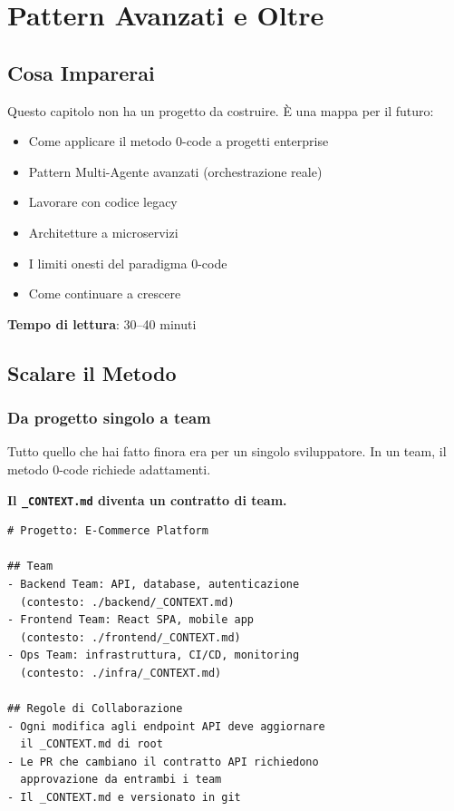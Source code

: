 \chapter{Pattern Avanzati e Oltre}

\section*{Cosa Imparerai}
Questo capitolo non ha un progetto da costruire. È una mappa per il futuro:
\begin{itemize}
  \item Come applicare il metodo 0-code a progetti enterprise
  \item Pattern Multi-Agente avanzati (orchestrazione reale)
  \item Lavorare con codice legacy
  \item Architetture a microservizi
  \item I limiti onesti del paradigma 0-code
  \item Come continuare a crescere
\end{itemize}

\textbf{Tempo di lettura}: 30--40 minuti

\section{Scalare il Metodo}

\subsection{Da progetto singolo a team}

Tutto quello che hai fatto finora era per un singolo sviluppatore. In un team, il metodo 0-code richiede adattamenti.

\textbf{Il \texttt{\_CONTEXT.md} diventa un contratto di team.}

\begin{lstlisting}[language={},title={Contesto di team}]
# Progetto: E-Commerce Platform

## Team
- Backend Team: API, database, autenticazione
  (contesto: ./backend/_CONTEXT.md)
- Frontend Team: React SPA, mobile app
  (contesto: ./frontend/_CONTEXT.md)
- Ops Team: infrastruttura, CI/CD, monitoring
  (contesto: ./infra/_CONTEXT.md)

## Regole di Collaborazione
- Ogni modifica agli endpoint API deve aggiornare
  il _CONTEXT.md di root
- Le PR che cambiano il contratto API richiedono
  approvazione da entrambi i team
- Il _CONTEXT.md e versionato in git
\end{lstlisting}

